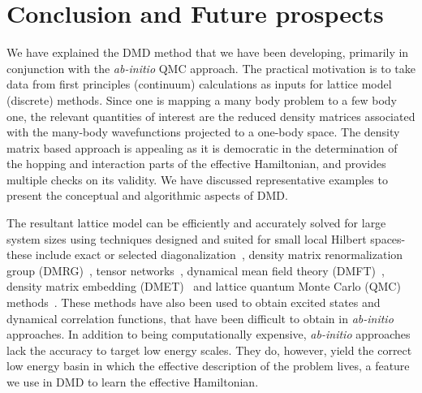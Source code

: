 \section{Conclusion and Future prospects}
We have explained the DMD method that we have been developing, primarily in conjunction with the 
\textit{ab-initio} QMC approach. The practical motivation is to take data from first principles (continuum) 
calculations as inputs for lattice model (discrete) methods. 
Since one is mapping a many body problem to a few body one, the relevant quantities of interest are 
the reduced density matrices associated with the many-body wavefunctions projected to a one-body space. 
The density matrix based approach is appealing as it is democratic 
in the determination of the hopping and interaction parts of the effective Hamiltonian, and provides multiple 
checks on its validity. We have discussed representative examples to present the conceptual and algorithmic aspects of DMD. 

The resultant lattice model can be efficiently and accurately solved for large system sizes 
using techniques designed and suited for small local Hilbert spaces- these include exact or 
selected diagonalization~\cite{DeRaedt,Tubman_selci,Holmes_Tubman_Umrigar}, 
density matrix renormalization group (DMRG)~\cite{White1992}, tensor networks~\cite{PEPS,Changlani_CPS,NeuscammanCPS}, 
dynamical mean field theory (DMFT)~\cite{Kotliar2006}, density matrix embedding (DMET)~\cite{DMET_2012} and 
lattice quantum Monte Carlo (QMC) methods~\cite{Scalapino, Trivedi_Ceperley, Zhang_AFQMC, Sandvik_loops, Prokofiev, 
Booth2009,SQMC,Holmes_Changlani_Umrigar, Booth2013}. These methods have also been used to obtain excited states 
and dynamical correlation functions, that have been difficult to obtain in \textit{ab-initio} approaches. 
In addition to being computationally expensive, \textit{ab-initio} approaches lack the accuracy to target 
low energy scales. They do, however, yield the correct low energy basin in which the effective description of 
the problem lives, a feature we use in DMD to learn the effective Hamiltonian. 

